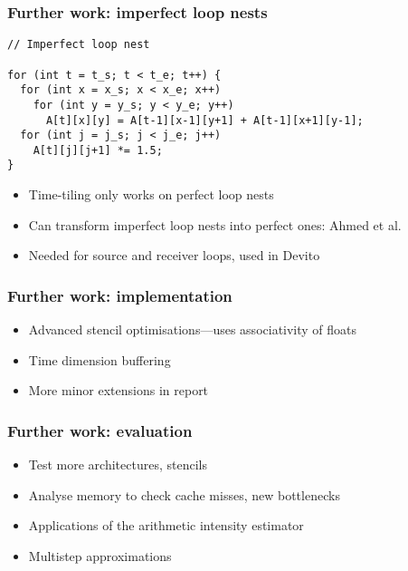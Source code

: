 \documentclass{beamer}
\begin{document}
\begin{frame}[fragile]
\frametitle{Further work: imperfect loop nests}

\begin{lstlisting}
// Imperfect loop nest

for (int t = t_s; t < t_e; t++) {
  for (int x = x_s; x < x_e; x++)
    for (int y = y_s; y < y_e; y++)
      A[t][x][y] = A[t-1][x-1][y+1] + A[t-1][x+1][y-1];
  for (int j = j_s; j < j_e; j++)
    A[t][j][j+1] *= 1.5;
}
\end{lstlisting}

\begin{itemize}
	\item Time-tiling only works on perfect loop nests
	\item Can transform imperfect loop nests into perfect ones: Ahmed et al.
	\item Needed for source and receiver loops, used in Devito
\end{itemize}
\end{frame}



\begin{frame}
\frametitle{Further work: implementation}

\begin{itemize}
	\item Advanced stencil optimisations---uses associativity of floats \Sadey
	\item Time dimension buffering
	\item More minor extensions in report
\end{itemize}
\end{frame}



\begin{frame}
\frametitle{Further work: evaluation}

\begin{itemize}
	\item Test more architectures, stencils
	\item Analyse memory to check cache misses, new bottlenecks
	\item Applications of the arithmetic intensity estimator
	\item Multistep approximations
\end{itemize}
\end{frame}



%
\end{document}
